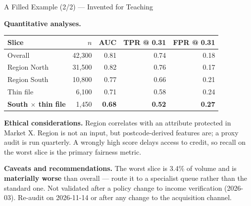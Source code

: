 \begin{frame}{A Filled Example (2/2) --- Invented for Teaching}

    \begin{tcolorbox}[colback=gray!4, colframe=raiBlue!60,
                      title={Model card --- \texttt{loan-default-v3} (continued)}, fonttitle=\bfseries]
        \scriptsize
        \textbf{Quantitative analyses.}

        \vspace{0.3em}
        \centering
        \begin{tabular}{lrrrr}
            \toprule
            \textbf{Slice} & \textbf{$n$} & \textbf{AUC} & \textbf{TPR @ 0.31} & \textbf{FPR @ 0.31} \\
            \midrule
            Overall              & 42{,}300 & 0.81 & 0.74 & 0.18 \\
            Region North         & 31{,}500 & 0.82 & 0.76 & 0.17 \\
            Region South         & 10{,}800 & 0.77 & 0.66 & 0.21 \\
            Thin file            &  6{,}100 & 0.71 & 0.58 & 0.24 \\
            \textbf{South $\times$ thin file} &  1{,}450 & \textbf{0.68} & \textbf{0.52} & \textbf{0.27} \\
            \bottomrule
        \end{tabular}

        \vspace{0.5em}
        \raggedright
        \textbf{Ethical considerations.} Region correlates with an attribute protected in Market X.
        Region is not an input, but postcode-derived features are; a proxy audit is run quarterly.
        A wrongly high score delays access to credit, so recall on the worst slice is the primary
        fairness metric.

        \vspace{0.35em}
        \textbf{Caveats and recommendations.} The worst slice is 3.4\% of volume and is
        \textbf{materially worse} than overall --- route it to a specialist queue rather than the
        standard one. Not validated after a policy change to income verification (2026-03).
        Re-audit on 2026-11-14 or after any change to the acquisition channel.
    \end{tcolorbox}
\end{frame}
